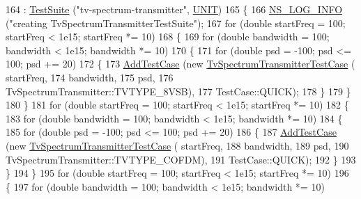 \begin{DoxyCode}
164   : \hyperlink{classns3_1_1TestSuite_a904b0c40583b744d30908aeb94636d1a}{TestSuite} (\textcolor{stringliteral}{"tv-spectrum-transmitter"}, \hyperlink{classns3_1_1TestSuite_a1ebfcab34ec8161e085e8e3a1855eae0a3885375a3787abf60431f8454b3cadbd}{UNIT})
165 \{
166   \hyperlink{group__logging_gafbd73ee2cf9f26b319f49086d8e860fb}{NS\_LOG\_INFO} (\textcolor{stringliteral}{"creating TvSpectrumTransmitterTestSuite"});
167   \textcolor{keywordflow}{for} (\textcolor{keywordtype}{double} startFreq = 100; startFreq < 1e15; startFreq *= 10)
168     \{
169       \textcolor{keywordflow}{for} (\textcolor{keywordtype}{double} bandwidth = 100; bandwidth < 1e15; bandwidth *= 10)
170         \{
171           \textcolor{keywordflow}{for} (\textcolor{keywordtype}{double} psd = -100; psd <= 100; psd += 20)
172             \{
173               \hyperlink{classns3_1_1TestCase_a3718088e3eefd5d6454569d2e0ddd835}{AddTestCase} (\textcolor{keyword}{new} \hyperlink{classTvSpectrumTransmitterTestCase}{TvSpectrumTransmitterTestCase} (
      startFreq, 
174                                                               bandwidth, 
175                                                               psd, 
176                                                               TvSpectrumTransmitter::TVTYPE\_8VSB), 
177                            TestCase::QUICK);
178             \}
179         \}
180     \}
181   \textcolor{keywordflow}{for} (\textcolor{keywordtype}{double} startFreq = 100; startFreq < 1e15; startFreq *= 10)
182     \{
183       \textcolor{keywordflow}{for} (\textcolor{keywordtype}{double} bandwidth = 100; bandwidth < 1e15; bandwidth *= 10)
184         \{
185           \textcolor{keywordflow}{for} (\textcolor{keywordtype}{double} psd = -100; psd <= 100; psd += 20)
186             \{
187               \hyperlink{classns3_1_1TestCase_a3718088e3eefd5d6454569d2e0ddd835}{AddTestCase} (\textcolor{keyword}{new} \hyperlink{classTvSpectrumTransmitterTestCase}{TvSpectrumTransmitterTestCase} (
      startFreq, 
188                                                               bandwidth, 
189                                                               psd, 
190                                                               TvSpectrumTransmitter::TVTYPE\_COFDM), 
191                            TestCase::QUICK);
192             \}
193         \}
194     \}
195   \textcolor{keywordflow}{for} (\textcolor{keywordtype}{double} startFreq = 100; startFreq < 1e15; startFreq *= 10)
196     \{
197       \textcolor{keywordflow}{for} (\textcolor{keywordtype}{double} bandwidth = 100; bandwidth < 1e15; bandwidth *= 10)

\end{DoxyCode}
